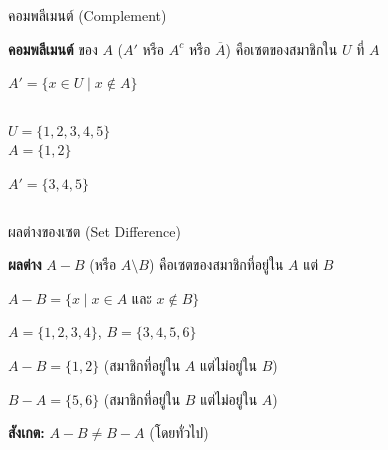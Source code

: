 \documentclass[11pt, aspectratio=169]{beamer}
\begin{document}
\begin{frame}{คอมพลีเมนต์ (Complement)}
  \begin{explanation}[นิยาม]
    \textbf{คอมพลีเมนต์} ของ $A$ ($A'$ หรือ $A^c$ หรือ $\overline{A}$) คือเซตของสมาชิกใน $U$
    ที่  $A$

    \medskip
    $A' = \{x \in U \mid x \notin A\}$
  \end{explanation}

  \begin{columns}[T]
      \centering

      \begin{exambox}[ตัวอย่าง]
        $U = \{1, 2, 3, 4, 5\}$ \\
        $A = \{1, 2\}$

        \medskip
        $A' = \{3, 4, 5\}$
      \end{exambox}
  \end{columns}
\end{frame}

\begin{frame}{ผลต่างของเซต (Set Difference)}
  \begin{explanation}[นิยาม]
    \textbf{ผลต่าง} $A - B$ (หรือ $A \setminus B$) คือเซตของสมาชิกที่อยู่ใน $A$ แต่  $B$

    \medskip
    $A - B = \{x \mid x \in A \text{ และ } x \notin B\}$
  \end{explanation}

  \begin{exambox}[ตัวอย่าง]
    $A = \{1, 2, 3, 4\}$, \quad $B = \{3, 4, 5, 6\}$

    \medskip
    $A - B = \{1, 2\}$ \quad (สมาชิกที่อยู่ใน $A$ แต่ไม่อยู่ใน $B$)

    $B - A = \{5, 6\}$ \quad (สมาชิกที่อยู่ใน $B$ แต่ไม่อยู่ใน $A$)

    \medskip
    \textbf{สังเกต:} $A - B \neq B - A$ (โดยทั่วไป)
  \end{exambox}
\end{frame}
\end{document}
